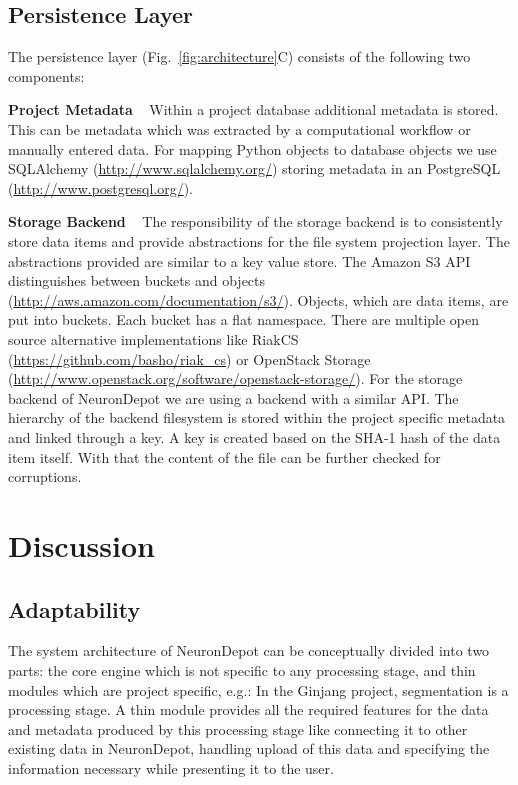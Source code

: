 \documentclass{frontiersSCNS} %
\begin{document}
\subsection{Persistence Layer}

The persistence layer (Fig.~\ref{fig:architecture}C) consists of the following two components:

\textbf{Project Metadata} \texttt{  } Within a project database additional
metadata is stored. This can be metadata which was extracted by a computational
workflow or manually entered data. For mapping Python objects to database
objects we use SQLAlchemy (\url{http://www.sqlalchemy.org/}) storing metadata
in an PostgreSQL (\url{http://www.postgresql.org/}).

\textbf{Storage Backend} \texttt{  } The responsibility of the storage backend
is to consistently store data items and provide abstractions for the file
system projection layer. The abstractions provided are similar to a key value
store. The Amazon S3 API distinguishes between buckets and objects
(\url{http://aws.amazon.com/documentation/s3/}). Objects, which are data items,
are put into buckets. Each bucket has a flat namespace. There are multiple open
source alternative implementations like RiakCS
(\url{https://github.com/basho/riak\_cs}) or OpenStack Storage
(\url{http://www.openstack.org/software/openstack-storage/}). For the storage
backend of NeuronDepot we are using a backend with a similar API. The hierarchy
of the backend filesystem is stored within the project specific metadata and
linked through a key. A key is created based on the SHA-1 hash of the data item
itself. With that the content of the file can be further checked for
corruptions.

\section{Discussion}

\subsection{Adaptability}
The system architecture of NeuronDepot can be conceptually divided into two
parts: the core engine which is not specific to any processing stage, and thin
modules which are project specific, e.g.: In the Ginjang project, segmentation
is a processing stage. A thin module provides all the required features for the
data and metadata produced by this processing stage like connecting it to other
existing data in NeuronDepot, handling upload of this data and specifying the
information necessary while presenting it to the user.
\end{document}
